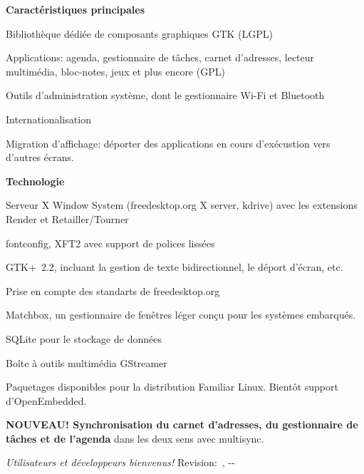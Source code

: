 {\smallskip
\textbf{Caract{\'e}ristiques principales}
\begin{compactitem}
   \item Biblioth{\`e}que d{\'e}di{\'e}e de composants graphiques GTK (LGPL)
   \item Applications: agenda, gestionnaire de t{\^a}ches, carnet d'adresses,
     lecteur multim{\'e}dia, bloc-notes, jeux et plus encore (GPL)
   \item Outils d'administration syst{\`e}me, dont le gestionnaire Wi-Fi et Bluetooth
   \item Internationalisation
   \item Migration d'affichage: d{\'e}porter des applications en cours d'ex{\'e}custion vers d'autres {\'e}crans.
\end{compactitem}

\smallskip
\textbf{Technologie}
\begin{compactitem}
   \item Serveur X Window System{\texttrademark}{} (freedesktop.org X
     server, kdrive) avec les extensions Render et
     Retailler/Tourner
   \item fontconfig, XFT2 avec support de polices liss{\'e}es
   \item GTK+~2.2, incluant la gestion de texte bidirectionnel, le d{\'e}port d'{\'e}cran, etc.
   \item Prise en compte des standarts de freedesktop.org
   \item Matchbox, un gestionnaire de fen{\^e}tres l{\'e}ger con\c{c}u pour les syst{\`e}mes embarqu{\'e}s.
   \item SQLite pour le stockage de donn{\'e}es
   \item Bo{\^i}te {\`a} outils multim{\'e}dia GStreamer
   \item Paquetages disponibles pour la distribution Familiar Linux. Bient{\^o}t support d'OpenEmbedded.
   \item \textbf{NOUVEAU! Synchronisation du carnet d'adresses, du gestionnaire de t{\^a}ches et de l'agenda} dans
   	les deux sens avec multisync.
\end{compactitem}

\smallskip
\textit{{\textexclamdown}Utilisateurs et d{\'e}veloppeurs bienvenus!}%
\hfill\tiny{Revision:~\rcsInfoRevision, \rcsInfoYear-\rcsInfoMonth-\rcsInfoDay}
}


